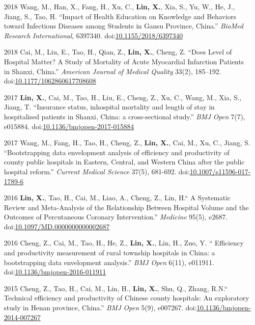 \documentclass[12pt,letterpaper]{report}
\begin{document}
\begin{tablist}
		\item[2018] \tab Wang, M., Han, X., Fang, H., Xu, C., \textbf{Lin, X.}, Xia, S., Yu, W., He, J., Jiang, S., Tao, H. \enquote{Impact of Health Education on Knowledge and Behaviors toward Infectious Diseases among Students in Gansu Province, China.} \textit{BioMed Research International}, 6397340. doi:\href{https://doi.org/10.1155/2018/6397340}{10.1155/2018/6397340}
		
		\item[2018] \tab Cai, M., Liu, E., Tao, H., Qian, Z., \textbf{Lin, X.}, Cheng, Z. \enquote{Does Level of Hospital Matter? A Study of Mortality of Acute Myocardial Infarction Patients in Shanxi, China.} \textit{American Journal of Medical Quality}  33(2), 185–192. doi:\href{https://doi.org/10.1177/1062860617708608}{10.1177/1062860617708608}
		
		\item[2017] \tab  \textbf{Lin, X.}, Cai, M., Tao, H., Liu, E., Cheng, Z., Xu, C., Wang, M., Xia, S., Jiang, T. \enquote{Insurance status, inhospital mortality and length of stay in hospitalised patients in Shanxi, China: a cross-sectional study.} \textit{BMJ Open}  7(7), e015884. doi:\href{https://doi.org/10.1136/bmjopen-2017-015884}{10.1136/bmjopen-2017-015884}
		   
		\item[2017] \tab Wang, M., Fang, H., Tao, H., Cheng, Z., \textbf{Lin, X.}, Cai, M., Xu, C., Jiang, S. \enquote{Bootstrapping data envelopment analysis of efficiency and productivity of county public hospitals in Eastern, Central, and Western China after the public hospital reform.} \textit{Current Medical Science}  37(5), 681-692. doi:\href{https://doi.org/10.1007/s11596-017-1789-6}{10.1007/s11596-017-1789-6}
    	 
		\item[2016] \tab \textbf{Lin, X.}, Tao, H., Cai, M., Liao, A., Cheng, Z., Lin, H.\enquote{ A Systematic Review and Meta-Analysis of the Relationship Between Hospital Volume and the Outcomes of Percutaneous Coronary Intervention.} \textit{Medicine}  95(5), e2687. doi:\href{https://doi.org/10.1097/MD.0000000000002687}{10.1097/MD.0000000000002687}
				
		\item[2016] \tab Cheng, Z., Cai, M., Tao, H., He, Z., \textbf{Lin, X.}, Lin, H., Zuo, Y. \enquote{ Efficiency and productivity measurement of rural township hospitals in China: a bootstrapping data envelopment analysis.} \textit{BMJ Open}  6(11), e011911. doi:\href{https://doi.org/10.1136/bmjopen-2016-011911}{10.1136/bmjopen-2016-011911}
		
		\item[2015] \tab Cheng, Z., Tao, H., Cai, M., Lin, H., \textbf{Lin, X.}, Shu, Q., Zhang, R.N.\enquote{ Technical efficiency and productivity of Chinese county hospitals: An exploratory study in Henan province, China.} \textit{BMJ Open}  5(9), e007267. doi:\href{https://doi.org/10.1136/bmjopen-2014-007267}{10.1136/bmjopen-2014-007267}

 \end{tablist}
\end{document}
